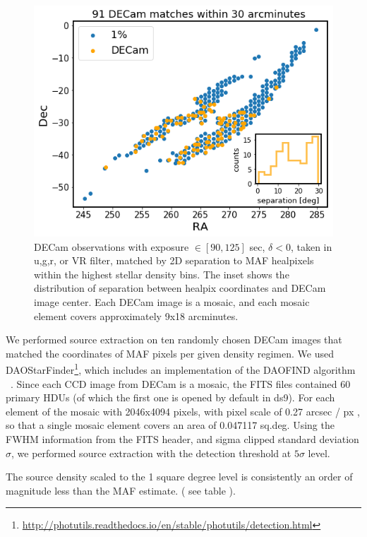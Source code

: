 \documentclass[DM,lsstdraft,toc,usenatbib]{lsstdoc}
\begin{document}
\begin{figure}
\includegraphics[width=1.0\columnwidth]{figs/Illustrate_top_1_perc_DECam_matches.png}
\caption{DECam observations with exposure $\in [90,125] $ sec, $\delta < 0$, taken in  u,g,r, or VR filter, matched by 2D separation to MAF healpixels within the highest stellar density bins. The inset shows the distribution of separation between healpix coordinates and DECam image center. Each DECam image is a mosaic, and each mosaic element covers approximately 9x18 arcminutes. }
\label{fig:decam_matches_top}
\end{figure} 

We performed source extraction on ten randomly chosen DECam images that matched the coordinates of MAF pixels per given density regimen.  We used DAOStarFinder\footnote{\url{http://photutils.readthedocs.io/en/stable/photutils/detection.html}}, which includes an implementation of the DAOFIND algorithm ~\citep{stetson1987}. Since each CCD image from DECam is a mosaic, the FITS files contained 60 primary HDUs (of which the first one is opened by default in ds9). For each element of the mosaic with 2046x4094 pixels, with pixel scale of 0.27 arcsec / px , so that a single mosaic element covers an area of 0.047117 sq.deg. Using the FWHM information from the FITS header, and sigma clipped standard deviation $\sigma$, we performed source extraction with the detection threshold at $5 \sigma$ level. 

The source density scaled to the 1 square degree level is consistently an order of magnitude less than the MAF estimate. ( see table ). 
\end{document}
